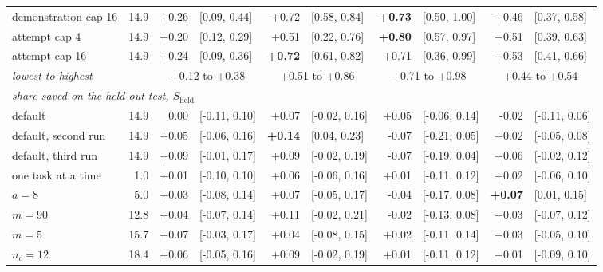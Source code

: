 \begin{tabular}{lrr@{\hspace{0.4em}}lr@{\hspace{0.4em}}lr@{\hspace{0.4em}}lr@{\hspace{0.4em}}l}
demonstration cap 16 & 14.9 & +0.26 & {\scriptsize [0.09, 0.44]} & +0.72 & {\scriptsize [0.58, 0.84]} & \textbf{+0.73} & {\scriptsize [0.50, 1.00]} & +0.46 & {\scriptsize [0.37, 0.58]} \\
attempt cap 4 & 14.9 & +0.20 & {\scriptsize [0.12, 0.29]} & +0.51 & {\scriptsize [0.22, 0.76]} & \textbf{+0.80} & {\scriptsize [0.57, 0.97]} & +0.51 & {\scriptsize [0.39, 0.63]} \\
attempt cap 16 & 14.9 & +0.24 & {\scriptsize [0.09, 0.36]} & \textbf{+0.72} & {\scriptsize [0.61, 0.82]} & +0.71 & {\scriptsize [0.36, 0.99]} & +0.53 & {\scriptsize [0.41, 0.66]} \\
\addlinespace[2pt]
\emph{lowest to highest} & & \multicolumn{2}{c}{+0.12 to +0.38} & \multicolumn{2}{c}{+0.51 to +0.86} & \multicolumn{2}{c}{+0.71 to +0.98} & \multicolumn{2}{c}{+0.44 to +0.54} \\
\midrule
\multicolumn{10}{l}{\emph{share saved on the held-out test, $S_{\mathrm{held}}$}} \\
default & 14.9 & 0.00 & {\scriptsize [-0.11, 0.10]} & +0.07 & {\scriptsize [-0.02, 0.16]} & +0.05 & {\scriptsize [-0.06, 0.14]} & -0.02 & {\scriptsize [-0.11, 0.06]} \\
default, second run & 14.9 & +0.05 & {\scriptsize [-0.06, 0.16]} & \textbf{+0.14} & {\scriptsize [0.04, 0.23]} & -0.07 & {\scriptsize [-0.21, 0.05]} & +0.02 & {\scriptsize [-0.05, 0.08]} \\
default, third run & 14.9 & +0.09 & {\scriptsize [-0.01, 0.17]} & +0.09 & {\scriptsize [-0.02, 0.19]} & -0.07 & {\scriptsize [-0.19, 0.04]} & +0.06 & {\scriptsize [-0.02, 0.12]} \\
one task at a time & 1.0 & +0.01 & {\scriptsize [-0.10, 0.10]} & +0.06 & {\scriptsize [-0.06, 0.16]} & +0.01 & {\scriptsize [-0.11, 0.12]} & +0.02 & {\scriptsize [-0.06, 0.10]} \\
$a = 8$ & 5.0 & +0.03 & {\scriptsize [-0.08, 0.14]} & +0.07 & {\scriptsize [-0.05, 0.17]} & -0.04 & {\scriptsize [-0.17, 0.08]} & \textbf{+0.07} & {\scriptsize [0.01, 0.15]} \\
$m = 90$ & 12.8 & +0.04 & {\scriptsize [-0.07, 0.14]} & +0.11 & {\scriptsize [-0.02, 0.21]} & -0.02 & {\scriptsize [-0.13, 0.08]} & +0.03 & {\scriptsize [-0.07, 0.12]} \\
$m = 5$ & 15.7 & +0.07 & {\scriptsize [-0.03, 0.17]} & +0.04 & {\scriptsize [-0.08, 0.15]} & +0.02 & {\scriptsize [-0.11, 0.14]} & +0.03 & {\scriptsize [-0.05, 0.10]} \\
$n_c = 12$ & 18.4 & +0.06 & {\scriptsize [-0.05, 0.16]} & +0.09 & {\scriptsize [-0.02, 0.19]} & +0.01 & {\scriptsize [-0.11, 0.12]} & +0.01 & {\scriptsize [-0.09, 0.10]} \\

\end{tabular}
